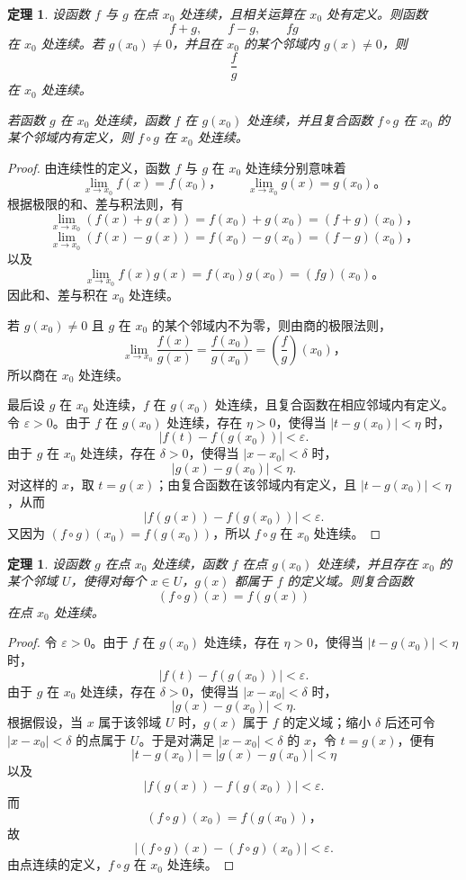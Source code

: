 \documentclass[UTF8,fontset=fandol,11pt]{ctexart}
\newtheorem{theorem}[definition]{定理}
\begin{document}
\begin{theorem}
设函数 $f$ 与 $g$ 在点 $x_0$ 处连续，且相关运算在 $x_0$ 处有定义。则函数
\[
f+g,
\qquad f-g,
\qquad fg
\]
在 $x_0$ 处连续。若 $g(x_0)\neq0$，并且在 $x_0$ 的某个邻域内 $g(x)\neq0$，则
\[
\frac{f}{g}
\]
在 $x_0$ 处连续。

若函数 $g$ 在 $x_0$ 处连续，函数 $f$ 在 $g(x_0)$ 处连续，并且复合函数 $f\circ g$ 在 $x_0$ 的某个邻域内有定义，则 $f\circ g$ 在 $x_0$ 处连续。\label{thm:continuity-algebra}
\end{theorem}
\begin{proof}
由连续性的定义，函数 $f$ 与 $g$ 在 $x_0$ 处连续分别意味着
\[
\lim_{x\to x_0}f(x)=f(x_0)\text{，}
\qquad
\lim_{x\to x_0}g(x)=g(x_0)\text{。}
\]
根据极限的和、差与积法则，有
\[
\lim_{x\to x_0}(f(x)+g(x))=f(x_0)+g(x_0)=(f+g)(x_0)\text{，}
\]
\[
\lim_{x\to x_0}(f(x)-g(x))=f(x_0)-g(x_0)=(f-g)(x_0)\text{，}
\]
以及
\[
\lim_{x\to x_0}f(x)g(x)=f(x_0)g(x_0)=(fg)(x_0)\text{。}
\]
因此和、差与积在 $x_0$ 处连续。

若 $g(x_0)\neq0$ 且 $g$ 在 $x_0$ 的某个邻域内不为零，则由商的极限法则，
\[
\lim_{x\to x_0}\frac{f(x)}{g(x)}
=\frac{f(x_0)}{g(x_0)}
=\left(\frac{f}{g}\right)(x_0)\text{，}
\]
所以商在 $x_0$ 处连续。

最后设 $g$ 在 $x_0$ 处连续，$f$ 在 $g(x_0)$ 处连续，且复合函数在相应邻域内有定义。令 $\varepsilon>0$。由于 $f$ 在 $g(x_0)$ 处连续，存在 $\eta>0$，使得当 $|t-g(x_0)|<\eta$ 时，
\[
|f(t)-f(g(x_0))|<\varepsilon.
\]
由于 $g$ 在 $x_0$ 处连续，存在 $\delta>0$，使得当 $|x-x_0|<\delta$ 时，
\[
|g(x)-g(x_0)|<\eta.
\]
对这样的 $x$，取 $t=g(x)$；由复合函数在该邻域内有定义，且 $|t-g(x_0)|<\eta$，从而
\[
|f(g(x))-f(g(x_0))|<\varepsilon.
\]
又因为 $(f\circ g)(x_0)=f(g(x_0))$，所以 $f\circ g$ 在 $x_0$ 处连续。
\end{proof}
\begin{theorem}
设函数 $g$ 在点 $x_0$ 处连续，函数 $f$ 在点 $g(x_0)$ 处连续，并且存在 $x_0$ 的某个邻域 $U$，使得对每个 $x\in U$，$g(x)$ 都属于 $f$ 的定义域。则复合函数
\[
(f\circ g)(x)=f(g(x))
\]
在点 $x_0$ 处连续。\label{thm:composition-continuity}
\end{theorem}
\begin{proof}
令 $\varepsilon>0$。由于 $f$ 在 $g(x_0)$ 处连续，存在 $\eta>0$，使得当 $|t-g(x_0)|<\eta$ 时，
\[
|f(t)-f(g(x_0))|<\varepsilon.
\]
由于 $g$ 在 $x_0$ 处连续，存在 $\delta>0$，使得当 $|x-x_0|<\delta$ 时，
\[
|g(x)-g(x_0)|<\eta.
\]
根据假设，当 $x$ 属于该邻域 $U$ 时，$g(x)$ 属于 $f$ 的定义域；缩小 $\delta$ 后还可令 $|x-x_0|<\delta$ 的点属于 $U$。于是对满足 $|x-x_0|<\delta$ 的 $x$，令 $t=g(x)$，便有
\[
|t-g(x_0)|=|g(x)-g(x_0)|<\eta
\]
以及
\[
|f(g(x))-f(g(x_0))|<\varepsilon.
\]
而
\[
(f\circ g)(x_0)=f(g(x_0))\text{，}
\]
故
\[
|(f\circ g)(x)-(f\circ g)(x_0)|<\varepsilon.
\]
由点连续的定义，$f\circ g$ 在 $x_0$ 处连续。
\end{proof}
\end{document}
